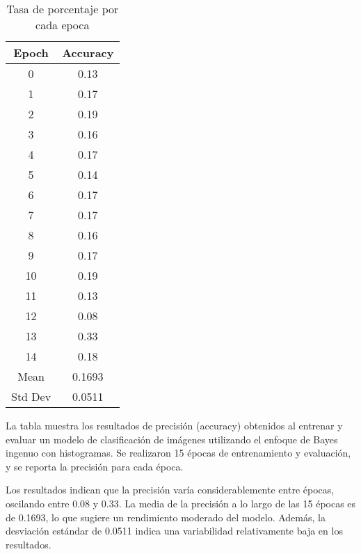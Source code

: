 \documentclass[spanish]{article}
\begin{document}
\begin{table}[htbp]
\centering
\caption{Tasa de porcentaje por cada epoca}
\label{tab:accuracy_results}
\begin{tabular}{|c|c|}
\hline
Epoch & Accuracy \\
\hline
0 & 0.13 \\
1 & 0.17 \\
2 & 0.19 \\
3 & 0.16 \\
4 & 0.17 \\
5 & 0.14 \\
6 & 0.17 \\
7 & 0.17 \\
8 & 0.16 \\
9 & 0.17 \\
10 & 0.19 \\
11 & 0.13 \\
12 & 0.08 \\
13 & 0.33 \\
14 & 0.18 \\
Mean & 0.1693 \\
Std Dev & 0.0511 \\
\hline
\end{tabular}
\end{table}

\par La tabla muestra los resultados de precisión (accuracy) obtenidos al entrenar y evaluar un modelo de clasificación de imágenes utilizando el enfoque de Bayes ingenuo con histogramas. Se realizaron 15 épocas de entrenamiento y evaluación, y se reporta la precisión para cada época.
\par Los resultados indican que la precisión varía considerablemente entre épocas, oscilando entre 0.08 y 0.33. La media de la precisión a lo largo de las 15 épocas es de 0.1693, lo que sugiere un rendimiento moderado del modelo. Además, la desviación estándar de 0.0511 indica una variabilidad relativamente baja en los resultados.

\newpage
\end{document}
